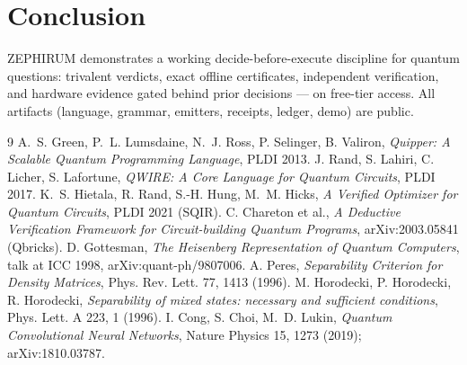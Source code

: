 \documentclass[11pt]{article}
\begin{document}
\section{Conclusion}
ZEPHIRUM demonstrates a working decide-before-execute discipline for
quantum questions: trivalent verdicts, exact offline certificates,
independent verification, and hardware evidence gated behind prior
decisions --- on free-tier access. All artifacts (language, grammar,
emitters, receipts, ledger, demo) are public.

\begin{thebibliography}{9}
 A.~S. Green, P.~L. Lumsdaine, N.~J. Ross, P. Selinger,
B. Valiron, \emph{Quipper: A Scalable Quantum Programming Language},
PLDI 2013.
 J. Rand, S. Lahiri, C. Licher, S. Lafortune,
\emph{QWIRE: A Core Language for Quantum Circuits}, PLDI 2017.
 K.~S. Hietala, R. Rand, S.-H. Hung, M.~M. Hicks,
\emph{A Verified Optimizer for Quantum Circuits}, PLDI 2021 (SQIR).
 C. Chareton et al., \emph{A Deductive Verification
Framework for Circuit-building Quantum Programs}, arXiv:2003.05841 (Qbricks).
 D. Gottesman, \emph{The Heisenberg Representation of
Quantum Computers}, talk at ICC 1998, arXiv:quant-ph/9807006.
 A. Peres, \emph{Separability Criterion for Density
Matrices}, Phys. Rev. Lett. 77, 1413 (1996).
 M. Horodecki, P. Horodecki, R. Horodecki,
\emph{Separability of mixed states: necessary and sufficient conditions},
Phys. Lett. A 223, 1 (1996).
 I. Cong, S. Choi, M.~D. Lukin, \emph{Quantum Convolutional
Neural Networks}, Nature Physics 15, 1273 (2019); arXiv:1810.03787.
\end{thebibliography}
\end{document}
